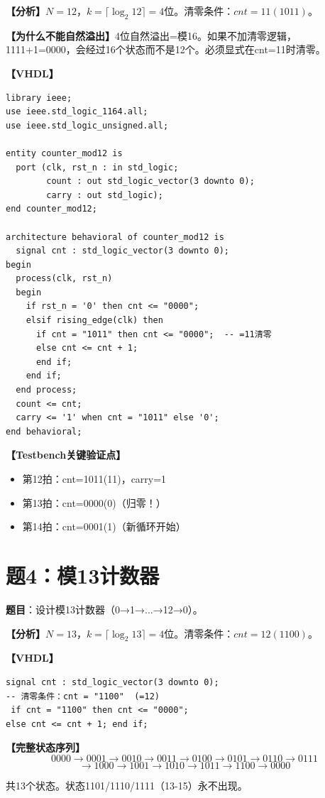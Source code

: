 \begin{solution}[完整解答]

\textbf{【分析】}$N=12$，$k=\lceil\log_2 12\rceil=4$位。清零条件：$cnt=11(1011)$。

\textbf{【为什么不能自然溢出】}4位自然溢出=模16。如果不加清零逻辑，1111+1=0000，会经过16个状态而不是12个。必须显式在cnt=11时清零。

\textbf{【VHDL】}
\begin{lstlisting}
library ieee;
use ieee.std_logic_1164.all;
use ieee.std_logic_unsigned.all;

entity counter_mod12 is
  port (clk, rst_n : in std_logic;
        count : out std_logic_vector(3 downto 0);
        carry : out std_logic);
end counter_mod12;

architecture behavioral of counter_mod12 is
  signal cnt : std_logic_vector(3 downto 0);
begin
  process(clk, rst_n)
  begin
    if rst_n = '0' then cnt <= "0000";
    elsif rising_edge(clk) then
      if cnt = "1011" then cnt <= "0000";  -- =11清零
      else cnt <= cnt + 1;
      end if;
    end if;
  end process;
  count <= cnt;
  carry <= '1' when cnt = "1011" else '0';
end behavioral;
\end{lstlisting}

\textbf{【Testbench关键验证点】}
\begin{itemize}
  \item 第12拍：cnt=1011(11)，carry=1
  \item 第13拍：cnt=0000(0)（归零！）
  \item 第14拍：cnt=0001(1)（新循环开始）
\end{itemize}

\end{solution}


\section{题4：模13计数器}

\textbf{题目}：设计模13计数器（0→1→...→12→0）。

\begin{solution}[完整解答]

\textbf{【分析】}$N=13$，$k=\lceil\log_2 13\rceil=4$位。清零条件：$cnt=12(1100)$。

\textbf{【VHDL】}
\begin{lstlisting}
signal cnt : std_logic_vector(3 downto 0);
-- 清零条件：cnt = "1100"  (=12)
 if cnt = "1100" then cnt <= "0000";
else cnt <= cnt + 1; end if;
\end{lstlisting}

\textbf{【完整状态序列】}
$$0000\to0001\to0010\to0011\to0100\to0101\to0110\to0111$$
$$\to1000\to1001\to1010\to1011\to1100\to0000$$

共13个状态。状态1101/1110/1111（13-15）永不出现。

\end{solution}


